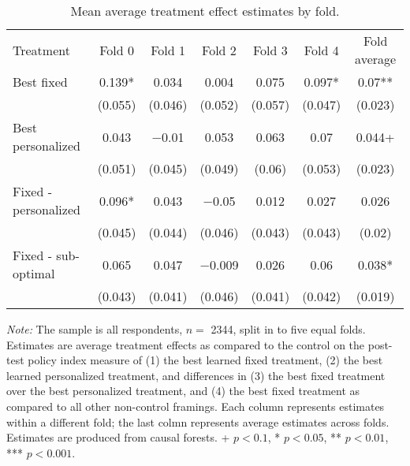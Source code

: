 \begin{table*}

\caption{\label{tab:unnamed-chunk-14}Mean average treatment effect estimates by fold. \label{tab:fold_estimates}}
\centering
\begin{threeparttable}
\begin{tabular}[t]{lcccccc}
\toprule
Treatment & Fold 0 & Fold 1 & Fold 2 & Fold 3 & Fold 4 & Fold average\\
\cmidrule(lr){2-2} \cmidrule(lr){3-3} \cmidrule(lr){4-4} \cmidrule(lr){5-5} \cmidrule(lr){6-6} \cmidrule(lr){7-7}
Best fixed & \num{0.139}* & \num{0.034} & \num{0.004} & \num{0.075} & \num{0.097}* & \num{0.07}**\\
 & (\num{0.055}) & (\num{0.046}) & (\num{0.052}) & (\num{0.057}) & (\num{0.047}) & (\num{0.023})\\
\addlinespace
Best personalized & \num{0.043} & \num{-0.01} & \num{0.053} & \num{0.063} & \num{0.07} & \num{0.044}+\\
 & (\num{0.051}) & (\num{0.045}) & (\num{0.049}) & (\num{0.06}) & (\num{0.053}) & (\num{0.023})\\
\addlinespace
Fixed - personalized & \num{0.096}* & \num{0.043} & \num{-0.05} & \num{0.012} & \num{0.027} & \num{0.026}\\
 & (\num{0.045}) & (\num{0.044}) & (\num{0.046}) & (\num{0.043}) & (\num{0.043}) & (\num{0.02})\\
\addlinespace
Fixed - sub-optimal & \num{0.065} & \num{0.047} & \num{-0.009} & \num{0.026} & \num{0.06} & \num{0.038}*\\
 & (\num{0.043}) & (\num{0.041}) & (\num{0.046}) & (\num{0.041}) & (\num{0.042}) & (\num{0.019})\\
\bottomrule
\end{tabular}
\begin{tablenotes}
\item \footnotesize \textit{Note:} The sample is all respondents, $n = $ \num{2344}, split in to five equal folds. Estimates are average treatment effects as compared to the control on the post-test policy index measure of (1) the best learned fixed treatment, (2) the best learned personalized treatment, and differences in (3) the best fixed treatment over the best personalized treatment, and (4) the best fixed treatment as compared to all other non-control framings. Each column represents estimates within a different fold; the last colmn represents average estimates across folds. Estimates are produced from causal forests.  + $p < 0.1$, * $p < 0.05$, ** $p < 0.01$, *** $p < 0.001$.
\end{tablenotes}
\end{threeparttable}
\end{table*}
